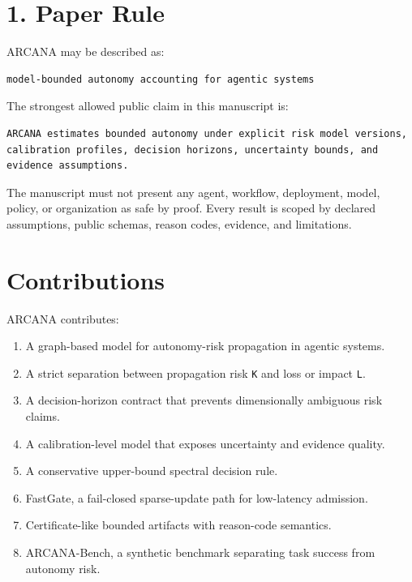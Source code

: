 \documentclass[
  american,
  a4paper,
  10pt]{article}
\providecommand{\tightlist}{%
  \setlength{\itemsep}{0pt}\setlength{\parskip}{0pt}}
\begin{document}
\section{1. Paper Rule}\label{1-paper-rule}

ARCANA may be described as:

\begin{Verbatim}[breaklines=true,breakanywhere=true,fontsize=\small]
model-bounded autonomy accounting for agentic systems
\end{Verbatim}

The strongest allowed public claim in this manuscript is:

\begin{Verbatim}[breaklines=true,breakanywhere=true,fontsize=\small]
ARCANA estimates bounded autonomy under explicit risk model versions, calibration profiles, decision horizons, uncertainty bounds, and evidence assumptions.
\end{Verbatim}

The manuscript must not present any agent, workflow, deployment, model, policy, or
organization as safe by proof. Every result is scoped by declared assumptions, public
schemas, reason codes, evidence, and limitations.

\section{Contributions}\label{contributions}

ARCANA contributes:

\begin{enumerate}
\def\labelenumi{\arabic{enumi}.}
\tightlist
\item
  A graph-based model for autonomy-risk propagation in agentic systems.
\item
  A strict separation between propagation risk \texttt{K} and loss or impact \texttt{L}.
\item
  A decision-horizon contract that prevents dimensionally ambiguous risk claims.
\item
  A calibration-level model that exposes uncertainty and evidence quality.
\item
  A conservative upper-bound spectral decision rule.
\item
  FastGate, a fail-closed sparse-update path for low-latency admission.
\item
  Certificate-like bounded artifacts with reason-code semantics.
\item
  ARCANA-Bench, a synthetic benchmark separating task success from autonomy risk.
\end{enumerate}
\end{document}
